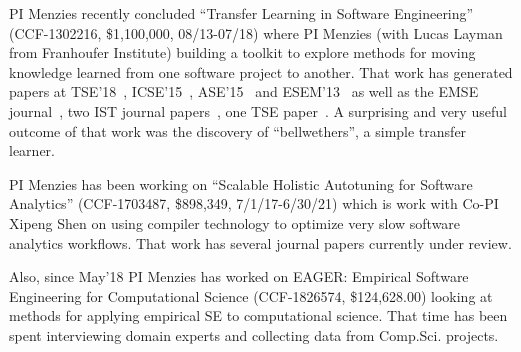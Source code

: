   PI Menzies recently concluded
``Transfer Learning in Software Engineering'' (CCF-1302216, \$1,100,000, 08/13-07/18)
where {PI Menzies} (with Lucas Layman from Franhoufer Institute) 
building a toolkit to explore  methods for moving knowledge
learned from one software project to another.  That work  has generated
papers at TSE'18~\cite{krishna2018bellwethers}, ICSE'15~\cite{PetersML15}, ASE'15~\cite{krishna16}  and ESEM'13~\cite{he13} as well as the EMSE journal~\cite{Me17}, two IST journal papers~\cite{fu2016tuning,krishna2017learning},
one TSE paper~\cite{nam2017heterogeneous}.   A surprising and very useful outcome of that work
was the discovery of ``bellwethers'',  a simple transfer learner.

 PI Menzies has been working on  ``Scalable Holistic Autotuning for Software Analytics''
(CCF-1703487, \$898,349, 7/1/17-6/30/21) which is work with Co-PI Xipeng Shen
on using compiler technology to optimize very slow software analytics workflows. 
That work has several journal papers currently under review.

Also, since May'18 PI Menzies has worked on 
 EAGER: Empirical Software Engineering for Computational Science (CCF-1826574, \$124,628.00) looking at methods for applying empirical SE to computational science.
 That time has been spent interviewing domain experts and collecting data from
 Comp.Sci. projects.